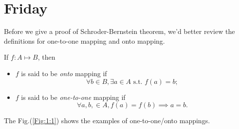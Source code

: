 
\section{Friday}
Before we give a proof of Schroder-Bernstein theorem, we'd better review the definitions for one-to-one mapping and onto mapping. 
\begin{definition}
If $f:A\mapsto B$, then 
\begin{itemize}
\item
$f$ is said to be \emph{onto} mapping if
\[
\forall b\in B,\exists a\in A\mbox{ s.t. }f(a)=b;
\]
\item
$f$ is said to be \emph{one-to-one} mapping if
\[
\forall a,b,\in A, f(a)=f(b)\implies a=b.
\]
\end{itemize}
\end{definition}
The Fig.(\ref{Fig:1:1}) shows the examples of one-to-one/onto mappings.
